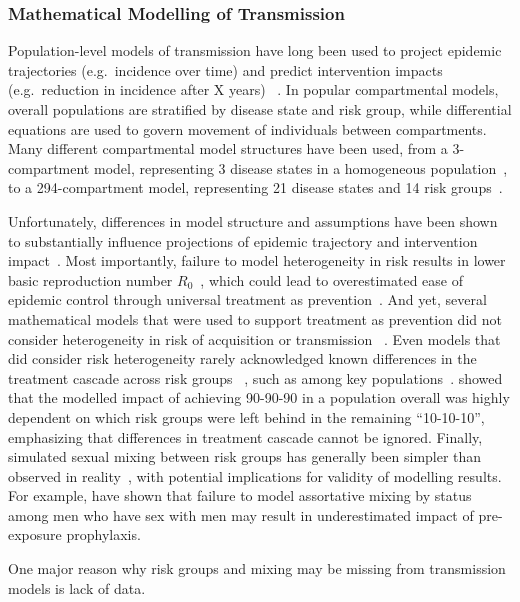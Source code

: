 \subsubsection*{Mathematical Modelling of \hiv Transmission}
Population-level models of \hiv transmission have long been used to
project \hiv epidemic trajectories
(e.g.\ incidence over time)
and predict intervention impacts
(e.g.\ reduction in incidence after X years)%
~\cite{Eaton2012}.
In popular compartmental models,
overall populations are stratified by disease state and risk group,
while differential equations are used to govern movement of individuals between compartments.
Many different compartmental model structures have been used,
from a 3-compartment model, representing
3 disease states in a homogeneous population~\cite{Moghadas2003},
to a 294-compartment model, representing
21 disease states and 14 risk groups~\cite{Kerr2015}.
\par
Unfortunately, differences in model structure and assumptions
have been shown to substantially influence projections of
epidemic trajectory and intervention impact~\cite{Eaton2012,Hontelez2013}.
Most importantly, failure to model heterogeneity in risk
results in lower basic reproduction number $R_0$~\cite{Anderson1986},
which could lead to overestimated ease of epidemic control
through universal treatment as prevention~\cite{Hontelez2013}.
And yet, several mathematical models that were used to support treatment as prevention
did not consider heterogeneity in risk of \hiv acquisition or transmission%
~\cite{Granich2009,Eaton2012,TBD}.
Even models that did consider risk heterogeneity
rarely acknowledged known differences in the treatment cascade across risk groups%
~\cite{Eaton2012,TBD},
such as among key populations~\cite{Gupta2017}.
\textcite{Knight2019} showed that
the modelled impact of achieving \mbox{90-90-90} in a population overall
was highly dependent on which risk groups were left behind in the remaining \mbox{``10-10-10''},
emphasizing that differences in treatment cascade cannot be ignored.
Finally, simulated sexual mixing between risk groups
has generally been simpler than observed in reality~\cite{TBD},
with potential implications for validity of modelling results.
For example, \textcite{Wang2019} have shown that
failure to model assortative mixing by \hiv status among men who have sex with men
may result in underestimated impact of pre-exposure prophylaxis.
\par
One major reason why risk groups and mixing may be missing
from \hiv transmission models is lack of data.
